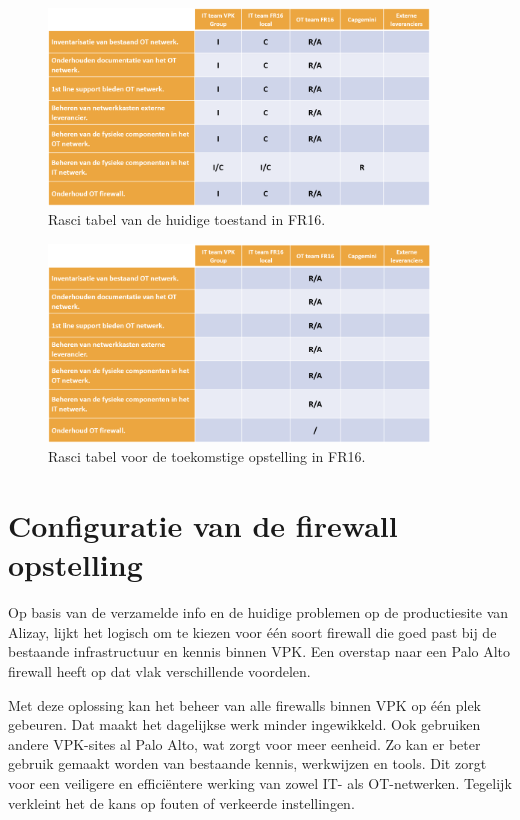 \begin{figure}[H]
    \centering
    \includegraphics[width=0.9\textwidth]{fotos/Rasci_AS-IS.png}
    \caption[Foto Rasci AS-IS]{\label{fig:grail}Rasci tabel van de huidige toestand in FR16.}
\end{figure} 

\begin{figure}[H]
    \centering
    \includegraphics[width=0.9\textwidth]{fotos/Rasci_TO-BE.png}
    \caption[Foto Rasci TO-BE]{\label{fig:grail}Rasci tabel voor de toekomstige opstelling in FR16.}
\end{figure} 



\chapter{Configuratie van de firewall opstelling}
\label{ch:configFW}

Op basis van de verzamelde info en de huidige problemen op de productiesite van Alizay, lijkt het logisch om te kiezen voor één soort firewall die goed past bij de bestaande infrastructuur en kennis binnen VPK. Een overstap naar een Palo Alto firewall heeft op dat vlak verschillende voordelen.

Met deze oplossing kan het beheer van alle firewalls binnen VPK op één plek gebeuren. Dat maakt het dagelijkse werk minder ingewikkeld. Ook gebruiken andere VPK-sites al Palo Alto, wat zorgt voor meer eenheid. Zo kan er beter gebruik gemaakt worden van bestaande kennis, werkwijzen en tools. Dit zorgt voor een veiligere en efficiëntere werking van zowel IT- als OT-netwerken. Tegelijk verkleint het de kans op fouten of verkeerde instellingen.

